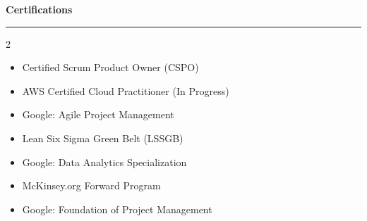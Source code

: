 \documentclass[9pt,letterpaper]{article} %
\newenvironment{rSection}[1]{ %
  \sectionskip
 \textbf{\Large #1} %
  \sectionlineskip
  \hrule %
  \begin{list}{}{ %
    \setlength{\leftmargin}{-0em} %
  }
  \item[]
}{
  \end{list}
}
\def\sectionlineskip{\smallskip} %
\def\sectionskip{} %
\begin{document}
\begin{rSection}{Certifications}
\begin{multicols}{2}
\begin{itemize}[left=-1.5em, labelsep=.1cm, labelwidth=.2cm, itemsep=0.0em, topsep=0pt]
\item Certified Scrum Product Owner (CSPO)
\item AWS Certified Cloud Practitioner (In Progress)
\item Google: Agile Project Management
\item Lean Six Sigma Green Belt (LSSGB)
\item Google: Data Analytics Specialization
\item McKinsey.org Forward Program
\item Google: Foundation of Project Management
\end{itemize}
\end{multicols}
\end{rSection}
\end{document}

